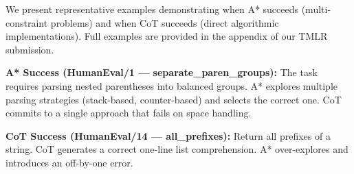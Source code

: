 We present representative examples demonstrating when A* succeeds (multi-constraint problems) and when CoT succeeds (direct algorithmic implementations). Full examples are provided in the appendix of our TMLR submission.

\textbf{A* Success (HumanEval/1 --- separate\_paren\_groups):} The task requires parsing nested parentheses into balanced groups. A* explores multiple parsing strategies (stack-based, counter-based) and selects the correct one. CoT commits to a single approach that fails on space handling.

\textbf{CoT Success (HumanEval/14 --- all\_prefixes):} Return all prefixes of a string. CoT generates a correct one-line list comprehension. A* over-explores and introduces an off-by-one error.

